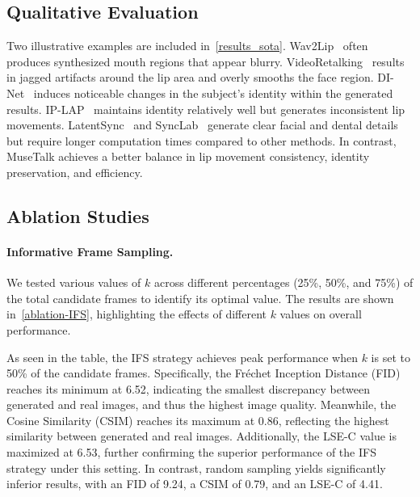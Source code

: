 \subsection{Qualitative Evaluation}
Two illustrative examples are included in~\cref{results_sota}. 
Wav2Lip~\cite{prajwal2020lip} often produces synthesized mouth regions that appear blurry. 
VideoRetalking~\cite{cheng2022videoretalking} results in jagged artifacts around the lip area and overly smooths the face region. 
DI-Net~\cite{zhang2023dinet} induces noticeable changes in the subject's identity within the generated results. 
IP-LAP~\cite{zhong2023identity} maintains identity relatively well but generates inconsistent lip movements. 
LatentSync~\cite{li2024latentsync} and SyncLab~\cite{sync_so_projects} generate clear facial and dental details but require longer computation times compared to other methods. 
In contrast, MuseTalk achieves a better balance in lip movement consistency, identity preservation, and efficiency.



\subsection{Ablation Studies}
\label{subsec:exp-ab}
\paragraph{Informative Frame Sampling.}
We tested various values of \( k \) across different percentages (25\%, 50\%, and 75\%) of the total candidate frames to identify its optimal value. The results are shown in~\cref{ablation-IFS}, highlighting the effects of different \( k \) values on overall performance.

As seen in the table, the IFS strategy achieves peak performance when \( k \) is set to 50\% of the candidate frames. Specifically, the Fréchet Inception Distance (FID) reaches its minimum at 6.52, indicating the smallest discrepancy between generated and real images, and thus the highest image quality. Meanwhile, the Cosine Similarity (CSIM) reaches its maximum at 0.86, reflecting the highest similarity between generated and real images. Additionally, the LSE-C value is maximized at 6.53, further confirming the superior performance of the IFS strategy under this setting. 
In contrast, random sampling yields significantly inferior results, with an FID of 9.24, a CSIM of 0.79, and an LSE-C of 4.41. 


